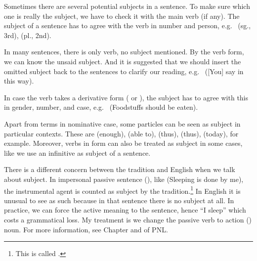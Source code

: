 Sometimes there are several potential subjects in a sentence. To make sure which one is really the subject, we have to check it with the main verb (if any). The subject of a sentence has to agree with the verb in number and person, e.g.\  (sg., 3rd),  (pl., 2nd).

In many sentences, there is only verb, no subject mentioned. By the verb form, we can know the unsaid subject. And it is suggested that we should insert the omitted subject back to the sentences to clarify our reading, e.g.\  ([You] say in this way).

In case the verb takes a derivative form ( or ), the subject has to agree with this in gender, number, and case, e.g.\  (Foodstuffs should be eaten).

Apart from terms in nominative case, some particles can be seen as subject in particular contexts. These are  (enough),  (able to),  (thus),  (thus),  (today), for example. Moreover, verbs in  form can also be treated as subject in some cases, like we use an infinitive as subject of a sentence.

There is a different concern between the tradition and English when we talk about subject. In impersonal passive sentence (), like  (Sleeping is done by me), the instrumental agent is counted as subject by the tradition.\footnote{This is called .} In English it is unusual to see as such because in that sentence there is no subject at all. In practice, we can force the active meaning to the sentence, hence ``I sleep'' which costs a grammatical loss. My treatment is we change the passive verb to action () noun. For more information, see Chapter  and  of PNL.

